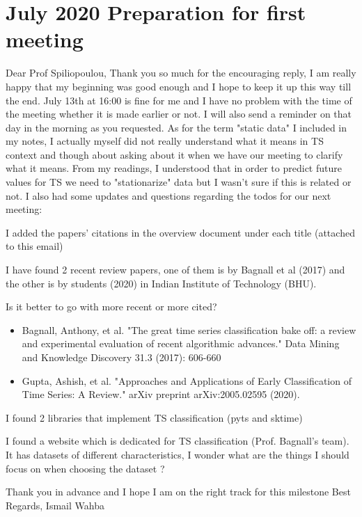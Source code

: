\documentclass{article}
\newcommand{\cmark}{\ding{51}}%
\newcommand{\done}{\rlap{$\square$}{\raisebox{2pt}{\large\hspace{1pt}\cmark}}%
\hspace{-2.5pt}}
\begin{document}
\section*{\texorpdfstring{}. July 2020 Preparation for first meeting}
Dear Prof Spiliopoulou,\newline
Thank you so much for the encouraging reply, I am really happy that my beginning was good enough and I hope to keep it up this way till the end.\newline
July 13th at 16:00 is fine for me and I have no problem with the time of the meeting whether it is made earlier or not.\newline
I will also send a reminder on that day in the morning as you requested.\newline
As for the term "static data" I included in my notes, I actually myself did not really understand what it means in TS context and though about asking about it when we have our meeting to clarify what it means. From my readings, I understood that in order to predict future values for TS we need to "stationarize" data but I wasn't sure if this is related or not.\newline
I also had some updates and questions regarding the todos for our next meeting:\newline
\begin{todolist}
	\item [\done] I added the papers' citations in the overview document under each title (attached to this email)
	\item I have found 2 recent review papers, one of them is by Bagnall et al (2017) and the other is by students (2020) in Indian Institute of Technology (BHU).
		\begin{todolist}
			\item Is it better to go with more recent or more cited?
		\end{todolist}
		\begin{itemize}
			\item Bagnall, Anthony, et al. "The great time series classification bake off: a review and experimental evaluation of recent algorithmic advances." Data Mining and Knowledge Discovery 31.3 (2017): 606-660
			\item Gupta, Ashish, et al. "Approaches and Applications of Early Classification of Time Series: A Review." arXiv preprint arXiv:2005.02595 (2020).
		\end{itemize}
	\item [\done] I found 2 libraries that implement TS classification (pyts and sktime)
	\item [\done] I found a website which is dedicated for TS classification (Prof. Bagnall's team). It has datasets of different characteristics, I wonder what are the things I should focus on when choosing the dataset ?
\end{todolist}
Thank you in advance and I hope I am on the right track for this milestone\newline
Best Regards,
Ismail Wahba
\end{document}
